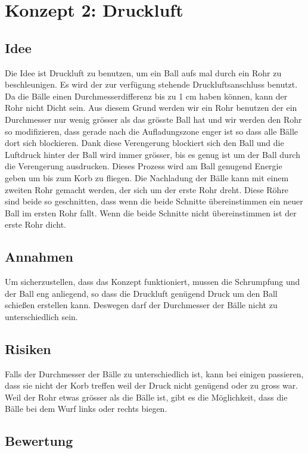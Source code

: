 \section{Konzept 2: Druckluft}

\subsection{Idee}
Die Idee ist Druckluft zu benutzen, um ein Ball aufs mal durch ein Rohr zu beschleunigen. Es wird der zur verfügung stehende Druckluftsanschluss benutzt. Da die Bälle einen Durchmesserdifferenz bis zu 1 cm haben können, kann der Rohr nicht Dicht sein. Aus diesem Grund werden wir ein Rohr benutzen der ein Durchmesser nur wenig grösser als das grösste Ball hat und wir werden den Rohr so modifizieren, dass gerade nach die Aufladungszone enger ist so dass alle Bälle dort sich blockieren. Dank diese Verengerung blockiert sich den Ball und die Luftdruck hinter der Ball wird immer grösser, bis es genug ist um der Ball durch die Verengerung ausdrucken. Dieses Prozess wird am Ball genugend Energie geben um bis zum Korb zu fliegen.
Die Nachladung der Bälle kann mit einem zweiten Rohr gemacht werden, der sich um der erste Rohr dreht. Diese Röhre sind beide so geschnitten, dass wenn die beide Schnitte übereinstimmen ein neuer Ball im ersten Rohr fallt. Wenn die beide Schnitte nicht übereinstimmen ist der erste Rohr dicht.
\subsection{Annahmen}
Um sicherzustellen, dass das Konzept funktioniert, mussen die Schrumpfung und der Ball eng anliegend, so dass die Druckluft genügend Druck um den Ball schießen erstellen kann. Deswegen darf der Durchmesser der Bälle nicht zu unterschiedlich sein. 

\subsection{Risiken}
Falls der Durchmesser der Bälle zu unterschiedlich ist, kann bei einigen passieren, dass sie nicht der Korb treffen weil der Druck nicht genügend oder zu gross war. Weil der Rohr etwas grösser als die Bälle ist, gibt es die Möglichkeit, dass die Bälle bei dem Wurf links oder rechts biegen. 

\subsection{Bewertung}

